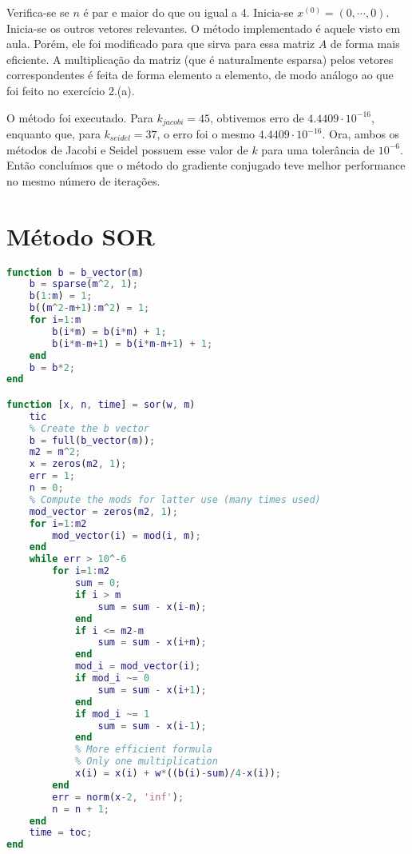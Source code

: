 \documentclass{article}
\begin{document}
\begin{enumerate}
\begin{enumerate}
                    Verifica-se se $n$ é par e maior do que ou igual a 4.
                    Inicia-se $x^{(0)} = (0, \cdots, 0)$. Inicia-se os outros vetores
                    relevantes. O método implementado é aquele visto em aula.
                    Porém, ele foi modificado para que sirva para essa matriz $A$ de forma mais eficiente.
                    A multiplicação da matriz (que é naturalmente esparsa) pelos vetores correspondentes é 
                    feita de forma elemento a elemento, de modo análogo ao que foi feito
                    no exercício 2.(a).

                    O método foi executado. Para $k_{jacobi} = 45$, obtivemos erro de $4.4409\cdot 10^{-16}$,
                    enquanto que, para $k_{seidel} = 37$, o erro foi o mesmo $4.4409\cdot 10^{-16}$. Ora, ambos os métodos
                    de Jacobi e Seidel possuem esse valor de $k$ para uma tolerância de $10^{-6}$. Então concluímos que
                    o método do gradiente conjugado teve melhor performance no mesmo número de iterações.
            \end{enumerate}

    \end{enumerate}

    \appendix

    \section{Método SOR}
        \label{appendix:a}

        \begin{lstlisting}[language=Matlab]
function b = b_vector(m)
    b = sparse(m^2, 1);
    b(1:m) = 1;
    b((m^2-m+1):m^2) = 1;
    for i=1:m
        b(i*m) = b(i*m) + 1;
        b(i*m-m+1) = b(i*m-m+1) + 1;
    end
    b = b*2;
end        

function [x, n, time] = sor(w, m)
    tic
    % Create the b vector
    b = full(b_vector(m));
    m2 = m^2;
    x = zeros(m2, 1);
    err = 1;
    n = 0;
    % Compute the mods for latter use (many times used)
    mod_vector = zeros(m2, 1);
    for i=1:m2
        mod_vector(i) = mod(i, m);
    end
    while err > 10^-6
        for i=1:m2
            sum = 0;
            if i > m
                sum = sum - x(i-m);
            end
            if i <= m2-m
                sum = sum - x(i+m);
            end
            mod_i = mod_vector(i);
            if mod_i ~= 0
                sum = sum - x(i+1);
            end
            if mod_i ~= 1
                sum = sum - x(i-1);
            end
            % More efficient formula
            % Only one multiplication
            x(i) = x(i) + w*((b(i)-sum)/4-x(i));
        end
        err = norm(x-2, 'inf');
        n = n + 1;
    end
    time = toc;
end

        \end{lstlisting}
\end{document}
